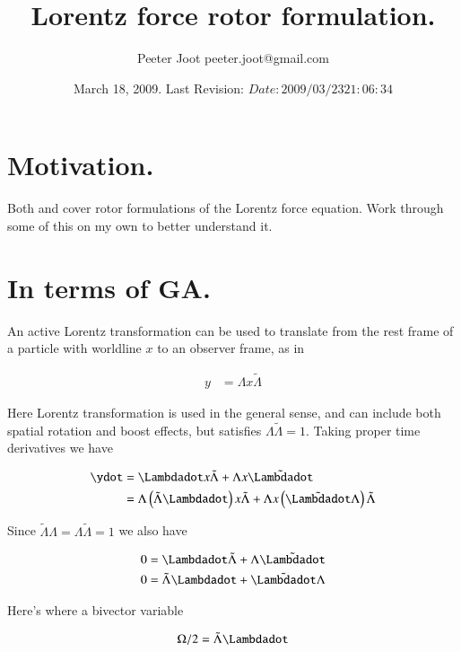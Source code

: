 \documentclass{article}
\title{ Lorentz force rotor formulation. }
\author{Peeter Joot \quad peeter.joot@gmail.com }
\date{ March 18, 2009.  Last Revision: $Date: 2009/03/23 21:06:34 $ }
\newcommand{\reverse}[1]{\tilde{{#1}}}
\begin{document}
\maketitle{}
\tableofcontents

\section{ Motivation. }

Both \cite{baylis-2007} and \cite{doran2003gap} cover rotor formulations
of the Lorentz force equation.  Work through some of this on my own to 
better understand it.

\section{ In terms of GA. }

An active Lorentz transformation can be used to translate from the rest frame of a particle with worldline $x$ to 
an observer frame, as in

\begin{align}\label{eqn:LorentzTx}
y &= \Lambda x \reverse{\Lambda}
\end{align}

Here Lorentz transformation is used in the general sense, and can include both spatial rotation and boost effects, but satisfies $\Lambda\reverse{\Lambda} = 1$.  Taking proper time derivatives we have

\begin{align*}
\ydot 
&= \Lambdadot x \reverse{\Lambda} + \Lambda x \reverse{\Lambdadot} \\
&= \Lambda \left(\reverse{\Lambda} \Lambdadot\right) x \reverse{\Lambda} + \Lambda x \left(\reverse{\Lambdadot} \Lambda \right) \reverse{\Lambda} \\
\end{align*}

Since $\reverse{\Lambda}\Lambda = \Lambda\reverse{\Lambda} = 1$ we also have

\begin{align*}
0 &= \Lambdadot\reverse{\Lambda} + \Lambda\reverse{\Lambdadot}  \\
0 &= \reverse{\Lambda}\Lambdadot + \reverse{\Lambdadot}\Lambda
\end{align*}

Here's where a bivector variable 

\begin{align}
\Omega/2 = \reverse{\Lambda} \Lambdadot
\end{align}
\end{document}

